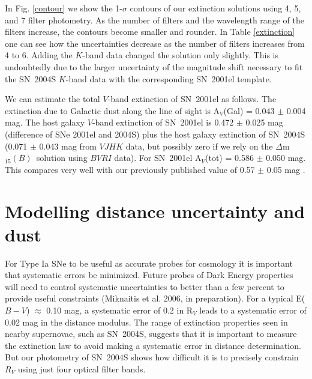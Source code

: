 \documentclass[12pt,preprint,psfig,epsf]{aastex}
\newcommand{\dmm}{\mbox{$\Delta$m$_{15}(B)$}}
\newcommand{\bvri}{\protect\hbox{$BV\!RI$} }
\begin{document}
In Fig. \ref{contour} we show the 1-$\sigma$ contours of our extinction solutions
using 4, 5, and 7 filter photometry.  As the number of filters and the wavelength
range of the filters increase, the contours become smaller and rounder.  In 
Table \ref{extinction} one can see how the uncertainties decrease as the
number of filters increases from 4 to 6.  Adding the $K$-band data changed the
solution only slightly.  This is undoubtedly due to the larger uncertainty
of the magnitude shift necessary to fit the SN~2004S $K$-band data with the 
corresponding SN~2001el template.

We can estimate the total $V$-band extinction of SN~2001el as follows. The
extinction due to Galactic dust along the line of sight is A$_V$(Gal) = 0.043 $\pm$
0.004 mag.  The host galaxy $V$-band extinction of SN~2001el is 0.472 $\pm$ 0.025
mag (difference of SNe 2001el and 2004S) plus the host galaxy extinction of SN~2004S
(0.071 $\pm$ 0.043 mag from $VJHK$ data, but possibly zero if we rely on the \dmm\
solution using \bvri data). For SN~2001el A$_V$(tot) = 0.586 $\pm$ 0.050 mag.  
This compares very well with our previously published value of 0.57 $\pm$ 0.05 mag
\citep{Kri_etal03}.

\section{Modelling distance uncertainty and dust}

For Type Ia SNe to be useful as accurate probes for cosmology
it is important that systematic errors be minimized.
Future probes of Dark Energy properties will need to control
systematic uncertainties to better than a few percent to
provide useful constraints (Miknaitis et al. 2006, in preparation).
For a typical E($B-V$) $\approx$ 0.10 mag, a systematic error of 0.2 in
R$_V$ leads to a systematic error of 0.02 mag in the distance modulus.
The range of extinction properties seen in nearby supernovae,
such as SN~2004S, suggests that it is important to measure
the extinction law to avoid making a systematic error in
distance determination. But our photometry of SN~2004S shows how
difficult it is to precisely constrain $R_V$ using just
four optical filter bands.
\end{document}
